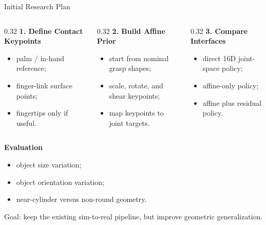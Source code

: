 \documentclass{beamer}
\begin{document}
\begin{frame}{Initial Research Plan}
    \small
    \vspace{1.25em}
    \begin{columns}[T,onlytextwidth]
        \begin{column}{0.32\textwidth}
            \textbf{\textcolor{maincolor}{1. Define Contact Keypoints}}
            \begin{itemize}
                \item palm / in-hand reference;
                \item finger-link surface points;
                \item fingertips only if useful.
            \end{itemize}
        \end{column}
        \begin{column}{0.32\textwidth}
            \textbf{\textcolor{maincolor}{2. Build Affine Prior}}
            \begin{itemize}
                \item start from nominal grasp shapes;
                \item scale, rotate, and shear keypoints;
                \item map keypoints to joint targets.
            \end{itemize}
        \end{column}
        \begin{column}{0.32\textwidth}
            \textbf{\textcolor{maincolor}{3. Compare Interfaces}}
            \begin{itemize}
                \item direct 16D joint-space policy;
                \item affine-only policy;
                \item affine plus residual policy.
            \end{itemize}
        \end{column}
    \end{columns}

    \vspace{0.8em}
    \textbf{\textcolor{maincolor}{Evaluation}}
    \begin{itemize}
        \item object size variation;
        \item object orientation variation;
        \item near-cylinder versus non-round geometry.
    \end{itemize}

    \vspace{0.35em}
    \centering
    \textcolor{maincolor}{Goal: keep the existing sim-to-real pipeline, but improve geometric generalization.}
\end{frame}

\QApage
\end{document}
